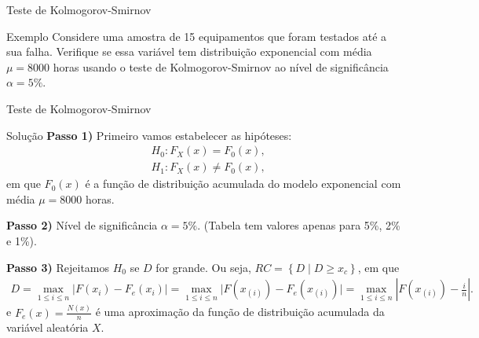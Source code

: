 \documentclass[10pt]{beamer}
\begin{document}
\begin{frame}{Teste de Kolmogorov-Smirnov}
	\begin{block}{Exemplo}
	Considere uma amostra de 15 equipamentos que foram testados até a sua falha. Verifique se essa variável tem distribuição exponencial com média $\mu=8000$ horas usando o teste de Kolmogorov-Smirnov ao nível de significância $\alpha=5\%$.
	\begin{table}[ht]
		\centering
		\caption{Tempo de vida de um equipamento.} 
		\label{tab:equipamento}
	\end{table}
\end{block}
\end{frame}

\begin{frame}{Teste de Kolmogorov-Smirnov}

\begin{block}{Solução}
	\textbf{Passo 1)} Primeiro vamos estabelecer as hipóteses:
	\begin{align*}
		&H_0: F_X(x) = F_0(x),\\
		&H_1: F_X(x) \neq F_0(x),
	\end{align*}
	em que $F_0(x)$ é a função de distribuição acumulada do modelo exponencial com média $\mu=8000$ horas.
	
	\textbf{Passo 2)} Nível de significância $\alpha = 5\%$. (Tabela tem valores apenas para 5\%, 2\%  e 1\%).
	
	\textbf{Passo 3)} Rejeitamos $H_0$ se $D$ for grande. Ou seja, $RC = \left\{ D \mid D \geq x_c \right\}$, em que 
	\begin{align*}
		D = \max_{1 \leq i \leq n} \lvert F(x_i) -F_e(x_i) \rvert= \max_{1 \leq i \leq n} \lvert F(x_{(i)}) -F_e(x_{(i)}) \rvert = \max_{1 \leq i \leq n} \left\lvert F(x_{(i)}) - \frac{i}{n} \right\rvert.
	\end{align*}
	e $F_e(x) = \frac{N(x)}{n}$ é uma aproximação da função de distribuição acumulada da variável aleatória $X$. 
\end{block}

\end{frame}
\end{document}
